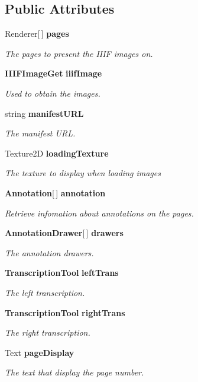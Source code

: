 \subsection*{Public Attributes}
\begin{DoxyCompactItemize}
\item 
Renderer[$\,$] {\bf pages}
\begin{DoxyCompactList}\small\item\em The pages to present the I\+I\+IF images on. \end{DoxyCompactList}\item 
{\bf I\+I\+I\+F\+Image\+Get} {\bf iiif\+Image}
\begin{DoxyCompactList}\small\item\em Used to obtain the images. \end{DoxyCompactList}\item 
string {\bf manifest\+U\+RL}
\begin{DoxyCompactList}\small\item\em The manifest U\+RL. \end{DoxyCompactList}\item 
Texture2D {\bf loading\+Texture}
\begin{DoxyCompactList}\small\item\em The texture to display when loading images \end{DoxyCompactList}\item 
{\bf Annotation}[$\,$] {\bf annotation}
\begin{DoxyCompactList}\small\item\em Retrieve infomation about annotations on the pages. \end{DoxyCompactList}\item 
{\bf Annotation\+Drawer}[$\,$] {\bf drawers}
\begin{DoxyCompactList}\small\item\em The annotation drawers. \end{DoxyCompactList}\item 
{\bf Transcription\+Tool} {\bf left\+Trans}
\begin{DoxyCompactList}\small\item\em The left transcription. \end{DoxyCompactList}\item 
{\bf Transcription\+Tool} {\bf right\+Trans}
\begin{DoxyCompactList}\small\item\em The right transcription. \end{DoxyCompactList}\item 
Text {\bf page\+Display}
\begin{DoxyCompactList}\small\item\em The text that display the page number. \end{DoxyCompactList}\end{DoxyCompactItemize}


